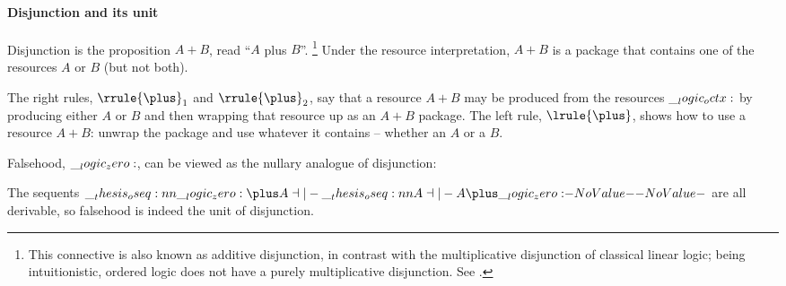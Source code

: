 \paragraph{Disjunction and its unit}
Disjunction is the proposition $A \plus B$, read \enquote{$A$ plus $B$}.%
\footnote{This connective is also known as additive disjunction, in contrast with the multiplicative disjunction of classical linear logic; being intuitionistic, ordered logic does not have a purely multiplicative disjunction.
  See \textcite{Chang+:CMU03}.}
Under the resource interpretation, $A \plus B$ is a package that contains one of the resources $A$ or $B$
(but not both).
The right rules, $\rrule{\plus}_1$ and $\rrule{\plus}_2$, say that a resource $A \plus B$ may be produced from the resources $\__logic_octx:$ by producing either $A$ or $B$ and then wrapping that resource up as an $A \plus B$ package.
The left rule, $\lrule{\plus}$, shows how to use a resource $A \plus B$: unwrap the package and use whatever it contains -- whether an $A$ or a $B$.

Falsehood, $\__logic_zero:$, can be viewed as the nullary analogue of disjunction:
The sequents $\oseq{\zero \plus A \dashv|- \oseq{A \dashv|- A \plus \zero}}$ are all derivable, so falsehood is indeed the unit of disjunction.

